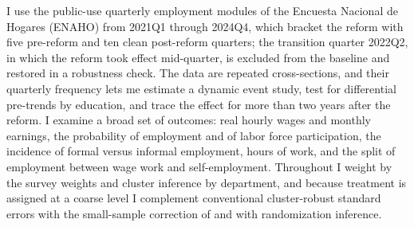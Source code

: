 I use the public-use quarterly employment modules of the Encuesta Nacional de Hogares (ENAHO)
from 2021Q1 through 2024Q4, which bracket the reform with five pre-reform and ten clean
post-reform quarters; the transition quarter 2022Q2, in which the reform took effect
mid-quarter, is excluded from the baseline and restored in a robustness check. The data are repeated cross-sections, and their quarterly
frequency lets me estimate a dynamic event study, test for differential pre-trends by
education, and trace the effect for more than two years after the reform. I examine a broad
set of outcomes: real hourly wages and monthly earnings, the probability of employment and of
labor force participation, the incidence of formal versus informal employment, hours of work,
and the split of employment between wage work and self-employment. Throughout I weight by the
survey weights and cluster inference by department, and because treatment is assigned at a
coarse level I complement conventional cluster-robust standard errors with the small-sample
correction of \citet{pustejovsky_tipton_2018} and with randomization inference.

